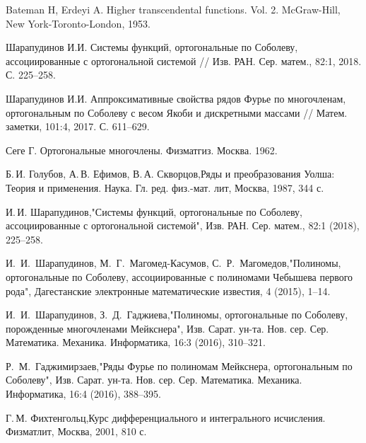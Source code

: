 \begin{thebibliography}{20}

{Bateman H, Erdeyi A.} Higher transcendental functions. Vol. 2. McGraw-Hill, New York-Toronto-London, 1953.


{Шарапудинов И.И.} Системы функций, ортогональные по Соболеву, ассоциированные с ортогональной системой // Изв. РАН. Сер. матем., 82:1, 2018. С. 225--258.


{Шарапудинов И.И.} Аппроксимативные свойства рядов Фурье по многочленам, ортогональным по Соболеву с весом Якоби и дискретными массами // Матем. заметки, 101:4, 2017. С. 611--629.


{Сеге Г.} Ортогональные многочлены. Физматгиз. Москва. 1962.


Б.\,И. Голубов, А.\,В. Ефимов, В.\,А. Скворцов,Ряды и преобразования Уолша: Теория и применения. Наука. Гл. ред. физ.-мат. лит, Москва, 1987, 344 с.


И.\,И. Шарапудинов,"Системы функций, ортогональные по Соболеву, ассоциированные с ортогональной системой", Изв. РАН. Сер. матем., 82:1 (2018), 225--258.


И.~И.~Шарапудинов, М.~Г.~Магомед-Касумов, С.~Р.~Магомедов,"Полиномы, ортогональные по Соболеву, ассоциированные с полиномами Чебышева первого рода", Дагестанские электронные математические известия, 4 (2015), 1--14.


И.~И.~Шарапудинов, З.~Д.~Гаджиева,"Полиномы, ортогональные по Соболеву, порожденные многочленами Мейкснера", Изв. Сарат. ун-та. Нов. сер. Сер. Математика. Механика. Информатика, 16:3 (2016), 310--321.


Р.~М.~Гаджимирзаев,"Ряды Фурье по полиномам Мейкснера, ортогональным по Соболеву", Изв. Сарат. ун-та. Нов. сер. Сер. Математика. Механика. Информатика, 16:4 (2016), 388--395.


Г.\,М. Фихтенгольц,Курс дифференциального и интегрального исчисления. Физматлит, Москва, 2001, 810 с.



\end{thebibliography}